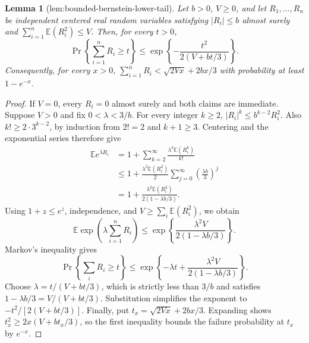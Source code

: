 \documentclass{article}
\newtheorem{lemma}{Lemma}
\begin{document}
\begin{lemma}[lem:bounded-bernstein-lower-tail]\label{lem:bounded-bernstein-lower-tail}
Let \(b>0\), \(V\ge0\), and let \(R_1,\ldots,R_n\) be independent centered real random variables satisfying \(|R_i|\le b\) almost surely and \(\sum_{i=1}^n\mathbb E(R_i^2)\le V\). Then, for every \(t>0\), \[\Pr\left\{\sum_{i=1}^nR_i\ge t\right\}\le\exp\left\{-\frac{t^2}{2(V+bt/3)}\right\}.\] Consequently, for every \(x>0\), \(\sum_{i=1}^nR_i<\sqrt{2Vx}+2bx/3\) with probability at least \(1-e^{-x}\).
\end{lemma}
\begin{proof}
If \(V=0\), every \(R_i=0\) almost surely and both claims are immediate. Suppose \(V>0\) and fix \(0<\lambda<3/b\). For every integer \(k\ge2\), \(|R_i|^k\le b^{k-2}R_i^2\). Also \(k!\ge2\cdot3^{k-2}\), by induction from \(2!=2\) and \(k+1\ge3\). Centering and the exponential series therefore give
\[\begin{aligned}\mathbb E e^{\lambda R_i}&=1+\sum_{k=2}^\infty\frac{\lambda^k\mathbb E(R_i^k)}{k!}\\&\le1+\frac{\lambda^2\mathbb E(R_i^2)}2\sum_{j=0}^\infty\left(\frac{\lambda b}{3}\right)^j\\&=1+\frac{\lambda^2\mathbb E(R_i^2)}{2(1-\lambda b/3)}.\end{aligned}\]
Using \(1+z\le e^z\), independence, and \(V\ge\sum_i\mathbb E(R_i^2)\), we obtain
\[\mathbb E\exp\left(\lambda\sum_{i=1}^nR_i\right)\le\exp\left\{\frac{\lambda^2V}{2(1-\lambda b/3)}\right\}.\]
Markov's inequality gives
\[\Pr\left\{\sum_iR_i\ge t\right\}\le\exp\left\{-\lambda t+\frac{\lambda^2V}{2(1-\lambda b/3)}\right\}.\]
Choose \(\lambda=t/(V+bt/3)\), which is strictly less than \(3/b\) and satisfies \(1-\lambda b/3=V/(V+bt/3)\). Substitution simplifies the exponent to \(-t^2/[2(V+bt/3)]\). Finally, put \(t_x=\sqrt{2Vx}+2bx/3\). Expanding shows \(t_x^2\ge2x(V+bt_x/3)\), so the first inequality bounds the failure probability at \(t_x\) by \(e^{-x}\).
\end{proof}
\end{document}
